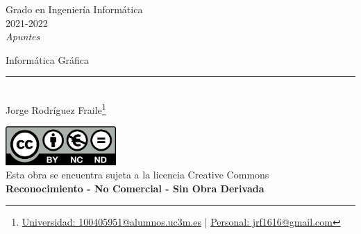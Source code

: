 \documentclass[12pt, twoside, openright]{report} %
\begin{document}

\begin{titlepage}
  \begin{sffamily}
    \color{azulUC3M}
    \begin{center}
      \begin{figure}[H] %
      \end{figure}
      \vspace{2.5cm}
      \begin{Large}
        Grado en Ingeniería Informática\\
        2021-2022\\
        \vspace{2cm}
        \textsl{Apuntes}\\
        \bigskip
      \end{Large}
      {\Huge Informática Gráfica}\\
      \vspace*{0.5cm}
      \rule{10.5cm}{0.1mm}\\
      \vspace*{0.9cm}
      {\LARGE Jorge Rodríguez Fraile\footnote{\href{mailto:100405951@alumnos.uc3m.es}{Universidad: 100405951@alumnos.uc3m.es}  |  \href{mailto:jrf1616@gmail.com}{Personal: jrf1616@gmail.com}}}\\
      \vspace*{1cm}
    \end{center}
    \vfill
    \color{black}
    \includegraphics[width=4.2cm]{img/creativecommons.png}\\
    Esta obra se encuentra sujeta a la licencia Creative Commons\\ \textbf{Reconocimiento - No Comercial - Sin Obra Derivada}
  \end{sffamily}
\end{titlepage}

\end{document}
